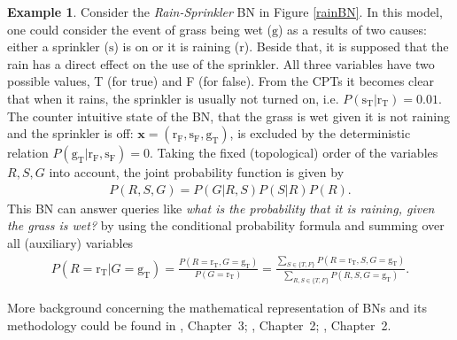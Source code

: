\documentclass[a4paper, twoside, 11pt]{report}
\theoremstyle{plain}
\theoremstyle{definition}
\newtheorem{example}[thm]{Example}
\theoremstyle{remark}
\renewcommand{\gg}{{\text{g} }}
\newcommand{\gT}{{\text{g}_\text{T} }}
\renewcommand{\ss}{{\text{s} }}
\newcommand{\sT}{{\text{s}_\text{T} }}
\newcommand{\sF}{{\text{s}_\text{F} }}
\newcommand{\rr}{{\text{r} }}
\newcommand{\rT}{{\text{r}_\text{T} }}
\newcommand{\rF}{{\text{r}_\text{F} }}
\newcommand{\bfx}{{\mathbf{x}}}
\begin{document}
\begin{example}\label{ex:rain-sprinkler}
Consider the \textit{Rain-Sprinkler} BN in Figure \ref{rainBN}. In this model, one could consider the event of grass being wet ($\gg$) as a results of two causes: either a sprinkler ($\ss$) is on or it is raining ($\rr$). Beside that, it is supposed that the rain has a direct effect on the use of the sprinkler. All three variables have two possible values, T (for true) and F (for false). From the CPTs it becomes clear that when it rains, the sprinkler is usually not turned on, i.e. $P( \sT |  \rT) = 0.01$. The counter intuitive state of the BN, that the grass is wet given it is not raining and the sprinkler is off: $\bfx = (\rF,  \sF, \gT)$, is excluded by the deterministic relation $P(\gT | \rF,  \sF) = 0$.  Taking the fixed (topological) order of the variables $R, S, G$ into account, the joint probability function is given by
\begin{align}
P(R, S, G) = P(G | R, S) P(S|R) P(R).
\label{eq:jointprob}
\end{align}
This BN can answer queries like \textit{what is the probability that it is raining, given the grass is wet?} by using the conditional probability formula and summing over all (auxiliary) variables
\begin{align}
P(R = \rT | G = \gT) = \frac{P(R = \rT, G = \gT)}{P(G = \rT)} = \frac{\sum_{S \in \{T,F\}} P(R = \rT, S, G = \gT)}{\sum_{R, S \in \{T,F\}} P(R, S, G = \gT)}.
\label{eq:conditional-summation}
\end{align}
\end{example}
More background concerning the mathematical representation of BNs and its methodology could be found in \cite{koller2009probabilistic}, Chapter~3; \cite{nielsen2009bayesian}, Chapter~2; \cite{pearl2014probabilistic}, Chapter~2. 
\end{document}
